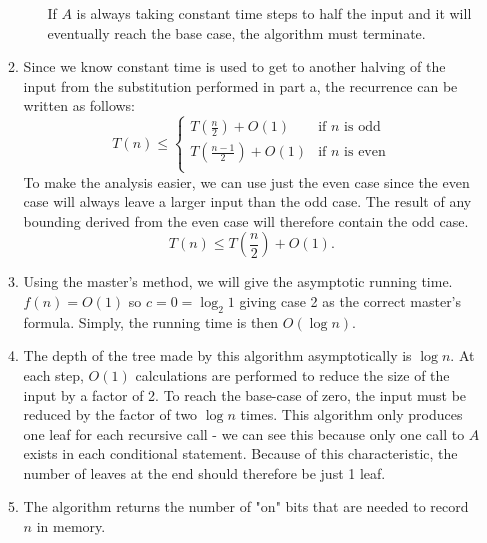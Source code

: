 \documentclass[letterpaper,11pt]{article}
\begin{document}
\begin{enumerate}
\begin{enumerate}
\begin{itemize}
                If $A$ is always taking constant time steps to half the input
                and it will eventually reach the base case, the algorithm must 
                terminate. 
            \end{itemize}
        \item Since we know constant time is used to get to another halving of 
            the input from the substitution performed in part a, the recurrence
            can be written as follows:
            \[ 
                T\left( n \right) \le 
                \begin{cases}
                    T\left( \frac{n}{2} \right) + O\left( 1 \right)  & \text{if $n$ is odd} \\
                    T\left( \frac{n-1}{2} \right) + O\left( 1 \right)  & \text{if $n$ is even} \\
                \end{cases}
            \]
            To make the analysis easier, we can use just the even case since
            the even case will always leave a larger input than the odd case. 
            The result of any bounding derived from the even case will therefore
            contain the odd case. 
            \[
                T\left( n \right) \le  T\left( \frac{n}{2} \right) + O\left( 1 \right)
            .\] 

        \item Using the master's method, we will give the asymptotic running 
            time. $f(n) = O\left( 1 \right) $ so $c = 0 = \log_{2}{1}$ giving
            case 2 as the correct master's formula. Simply, the running time 
            is then $O\left( \log{n} \right) $.

        \item The depth of the tree made by this algorithm asymptotically is 
            $\log{n}$. At each step, $O\left( 1 \right) $ calculations are 
            performed to reduce the size of the input by a factor of 2. To reach
            the base-case of zero, the input must be reduced by the factor of
            two $\log{n}$ times. This algorithm only produces one leaf for each 
            recursive call - we can see this because only one call to $A$ exists
            in each conditional statement. Because of this characteristic, the 
            number of leaves at the end should therefore be just 1 leaf. 

        \item The algorithm returns the number of "on" bits that are needed to 
            record $n$ in memory.


\end{enumerate}
\end{enumerate}
\end{document}

